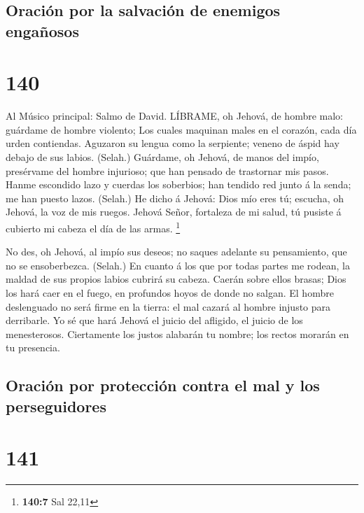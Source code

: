 \hypertarget{oraciuxf3n-por-la-salvaciuxf3n-de-enemigos-engauxf1osos}{%
\subsection{Oración por la salvación de enemigos
engañosos}\label{oraciuxf3n-por-la-salvaciuxf3n-de-enemigos-engauxf1osos}}

\hypertarget{section-139}{%
\section{140}\label{section-139}}

 Al Músico principal: Salmo de David. LÍBRAME, oh Jehová, de
hombre malo: guárdame de hombre violento;  Los cuales
maquinan males en el corazón, cada día urden contiendas. 
Aguzaron su lengua como la serpiente; veneno de áspid hay debajo de sus
labios. (Selah.)  Guárdame, oh Jehová, de manos del impío,
presérvame del hombre injurioso; que han pensado de trastornar mis
pasos.  Hanme escondido lazo y cuerdas los soberbios; han
tendido red junto á la senda; me han puesto lazos. (Selah.) 
He dicho á Jehová: Dios mío eres tú; escucha, oh Jehová, la voz de mis
ruegos.  Jehová Señor, fortaleza de mi salud, tú pusiste á
cubierto mi cabeza el día de las armas. \footnote{\textbf{140:7} Sal
  22,11}

 No des, oh Jehová, al impío sus deseos; no saques adelante
su pensamiento, que no se ensoberbezca. (Selah.)  En cuanto
á los que por todas partes me rodean, la maldad de sus propios labios
cubrirá su cabeza.  Caerán sobre ellos brasas; Dios los
hará caer en el fuego, en profundos hoyos de donde no salgan.
 El hombre deslenguado no será firme en la tierra: el mal
cazará al hombre injusto para derribarle.  Yo sé que hará
Jehová el juicio del afligido, el juicio de los menesterosos.
 Ciertamente los justos alabarán tu nombre; los rectos
morarán en tu presencia.

\hypertarget{oraciuxf3n-por-protecciuxf3n-contra-el-mal-y-los-perseguidores}{%
\subsection{Oración por protección contra el mal y los
perseguidores}\label{oraciuxf3n-por-protecciuxf3n-contra-el-mal-y-los-perseguidores}}

\hypertarget{section-140}{%
\section{141}\label{section-140}}

